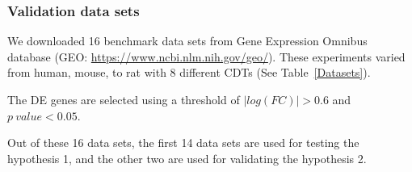 \subsubsection{Validation data sets}

We downloaded 16 benchmark data sets from Gene Expression Omnibus database (GEO: \url{https://www.ncbi.nlm.nih.gov/geo/}). 
These experiments varied from human, mouse, to rat with 8 different CDTs (See Table~\ref{Datasets}).

The DE genes are selected using a threshold of $|log(FC)| > 0.6$ and $p\ value < 0.05$.

Out of these 16 data sets, the first 14 data sets are used for testing the hypothesis 1, and the other two are used for validating the hypothesis 2.


